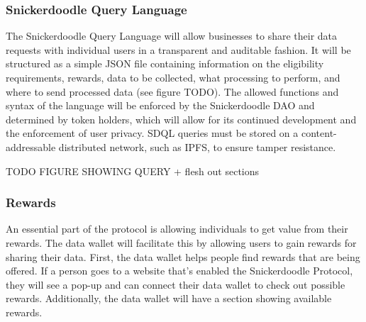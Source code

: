 \subsubsection{Snickerdoodle Query Language} %
\label{section:SDQL}
The Snickerdoodle Query Language will allow businesses to share their data requests with individual users in a transparent and auditable fashion. It will be structured as a simple JSON file containing information on the eligibility requirements, rewards, data to be collected, what processing to perform, and where to send processed data (see figure TODO). The allowed functions and syntax of the language will be enforced by the Snickerdoodle DAO and determined by token holders, which will allow for its continued development and the enforcement of user privacy. SDQL queries must be stored on a content-addressable distributed network, such as IPFS, to ensure tamper resistance. 

TODO FIGURE SHOWING QUERY + flesh out sections


\subsubsection{Rewards}

An essential part of the protocol is allowing individuals to get value from their rewards. The data wallet will facilitate this by allowing users to gain rewards for sharing their data. First, the data wallet helps people find rewards that are being offered. If a person goes to a website that's enabled the Snickerdoodle Protocol, they will see a pop-up and can connect their data wallet to check out possible rewards. Additionally, the data wallet will have a section showing available rewards.


